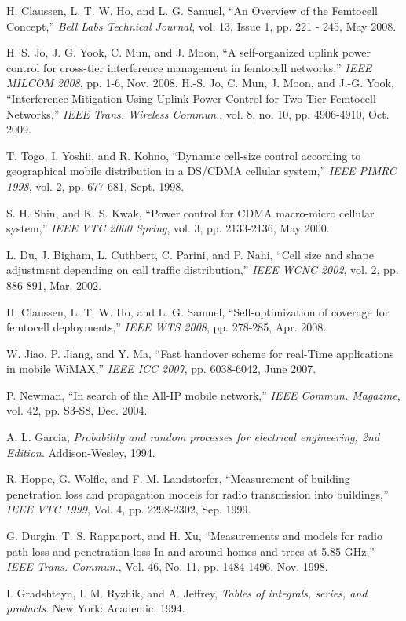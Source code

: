 \documentclass[draftclsnofoot,12pt,onecolumn]{IEEEtran}
\begin{document}
\begin{thebibliography}{10}

H. Claussen, L. T. W. Ho, and L. G. Samuel, ``An Overview of the
Femtocell Concept,'' {\it Bell Labs Technical Journal}, vol. 13,
Issue 1, pp. 221 - 245, May 2008.

H. S. Jo, J. G. Yook, C. Mun, and J. Moon, ``A self-organized uplink
power control for cross-tier interference management in femtocell
networks,'' {\it IEEE MILCOM 2008}, pp. 1-6, Nov. 2008.
H.-S. Jo, C. Mun, J. Moon, and J.-G. Yook, ``Interference Mitigation
Using Uplink Power Control for Two-Tier Femtocell Networks,'' {\it IEEE Trans. Wireless Commun.}, vol. 8, no. 10, pp. 4906-4910,
Oct. 2009.

T. Togo, I. Yoshii, and R. Kohno, ``Dynamic cell-size control
according to geographical mobile distribution in a DS/CDMA cellular
system,'' {\it IEEE  PIMRC 1998}, vol. 2, pp. 677-681, Sept. 1998.

S. H. Shin, and K. S. Kwak, ``Power control for CDMA macro-micro
cellular system,'' {\it IEEE VTC 2000 Spring}, vol. 3, pp.
2133-2136, May 2000.

L. Du, J. Bigham, L. Cuthbert, C. Parini, and P. Nahi, ``Cell size
and shape adjustment depending on call traffic distribution,'' {\it
IEEE WCNC 2002}, vol. 2, pp. 886-891, Mar. 2002.




H. Claussen, L. T. W. Ho, and L. G. Samuel, ``Self-optimization of
coverage for femtocell deployments,'' {\it IEEE WTS 2008}, pp.
278-285, Apr. 2008.

W. Jiao, P. Jiang, and Y. Ma, ``Fast handover scheme for real-Time
applications in mobile WiMAX,'' {\it IEEE ICC 2007}, pp. 6038-6042,
June 2007.

P. Newman, ``In search of the All-IP mobile network,'' {\it IEEE
Commun. Magazine}, vol. 42, pp. S3-S8, Dec. 2004.


A. L. Garcia, {\it Probability and random processes for electrical
engineering, 2nd Edition}. Addison-Wesley, 1994.


R. Hoppe, G. Wolfle, and F. M. Landstorfer, ``Measurement of
building penetration loss and propagation models for radio
transmission into buildings,'' {\it IEEE VTC 1999}, Vol. 4, pp.
2298-2302, Sep. 1999.

G. Durgin, T. S. Rappaport, and H. Xu, ``Measurements and models for
radio path loss and penetration loss In and around homes and trees
at 5.85 GHz,'' {\it IEEE Trans. Commun.}, Vol. 46, No. 11, pp.
1484-1496, Nov. 1998.

I. Gradshteyn, I. M. Ryzhik, and A. Jeffrey, {\it Tables of
integrals, series, and products}. New York: Academic, 1994.





\end{thebibliography}
\end{document}
